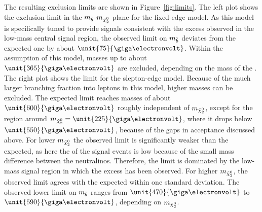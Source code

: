 The resulting exclusion limits are shown in Figure~\ref{fig:limits}. The left plot shows the exclusion limit in the $m_{\tilde{b}}$-$m_{{\tilde{\chi}^0_2}}$ plane for the fixed-edge model. As this model is specifically tuned to provide signals consistent with the excess observed in the low-mass central signal region, the observed limit on $m_{\tilde{b}}$ deviates from the expected one by about $\unit{75}{\giga\electronvolt}$. Within the assumption of this model, \sbottom masses up to about $\unit{365}{\giga\electronvolt}$ are excluded, depending on the mass of the \secondchi. The right plot shows the limit for the slepton-edge model. Because of the much larger branching fraction into leptons in this model, higher masses can be excluded. The expected limit reaches \sbottom masses of about $\unit{600}{\giga\electronvolt}$ roughly independent of $m_{{\tilde{\chi}^0_2}}$, except for the region around $m_{\secondchi} = \unit{225}{\giga\electronvolt}$, where it drops below $\unit{550}{\giga\electronvolt}$, because of the gaps in acceptance discussed above. For lower $m_{{\tilde{\chi}^0_2}}$ the observed limit is significantly weaker than the expected, as here the \mll of the signal events is low because of the small mass difference between the neutralinos. Therefore, the limit is dominated by the low-mass signal region in which the excess has been observed. For higher $m_{{\tilde{\chi}^0_2}}$, the observed limit agrees with the expected within one standard deviation. The observed lower limit on $m_{\tilde{b}}$ ranges from $\unit{470}{\giga\electronvolt}$ to $\unit{590}{\giga\electronvolt}$, depending on $m_{{\tilde{\chi}^0_2}}$.
